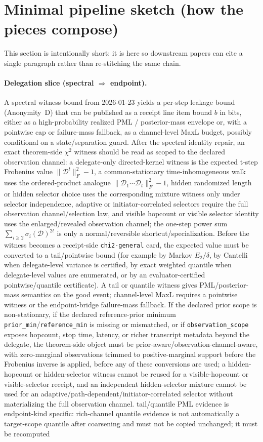 \documentclass[11pt]{article}
\begin{document}
\section{Minimal pipeline sketch (how the pieces compose)}
This section is intentionally short: it is here so downstream papers can cite a single paragraph rather than re-stitching the same chain.

\paragraph{Delegation slice (spectral $\Rightarrow$ endpoint).}
A spectral witness bound from 2026-01-23 yields a per-step leakage bound (Anonymity~D) that can be published as a receipt line item bound $b$ in bits, either as a high-probability realized PML / posterior-mass envelope or, with a pointwise cap or failure-mass fallback, as a channel-level MaxL budget, possibly conditional on a state/separation guard. After the spectral identity repair, an exact theorem-side $\chi^2$ witness should be read as scoped to the declared observation channel: a delegate-only directed-kernel witness is the expected t-step Frobenius value $\|\mathcal D^t\|_F^2-1$, a common-stationary time-inhomogeneous walk uses the ordered-product analogue $\|\mathcal D_1\cdots\mathcal D_t\|_F^2-1$, hidden randomized length or hidden selector choice uses the corresponding mixture witness only under selector independence, adaptive or initiator-correlated selectors require the full observation channel/selection law, and visible hopcount or visible selector identity uses the enlarged/revealed observation channel; the one-step power sum $\sum_{i\ge2}\sigma_i(\mathcal D)^{2t}$ is only a normal/reversible shortcut/specialization. Before the witness becomes a receipt-side \texttt{chi2-general} card, the expected value must be converted to a tail/pointwise bound (for example by Markov $E_2/\delta$, by Cantelli when delegate-level variance is certified, by exact weighted quantile when delegate-level values are enumerated, or by an evaluator-certified pointwise/quantile certificate). A tail or quantile witness gives PML/posterior-mass semantics on the good event; channel-level MaxL requires a pointwise witness or the endpoint-bridge failure-mass fallback. If the declared prior scope is non-stationary, if the declared reference-prior minimum \nolinkurl{prior_min}/\nolinkurl{reference_min} is missing or mismatched, or if \texttt{observation\_scope} exposes hopcount, stop time, latency, or richer transcript metadata beyond the delegate, the theorem-side object must be prior-aware/observation-channel-aware, with zero-marginal observations trimmed to positive-marginal support before the Frobenius inverse is applied, before any of these conversions are used; a hidden-hopcount or hidden-selector witness cannot be reused for a visible-hopcount or visible-selector receipt, and an independent hidden-selector mixture cannot be used for an adaptive/path-dependent/initiator-correlated selector without materializing the full observation channel. tail/quantile PML evidence is endpoint-kind specific: rich-channel quantile evidence is not automatically a target-scope quantile after coarsening and must not be copied unchanged; it must be recomputed 
\end{document}
